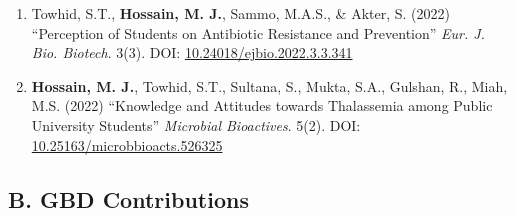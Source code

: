 \documentclass[
  11pt,
  letterpaper,
  DIV=11,
  numbers=noendperiod]{scrartcl}
\begin{document}
\begin{enumerate}
  DOI:
  \href{https://doi.org/10.1038/s41598-023-34205-9}{10.1038/s41598-023-34205-9}
\item
  Towhid, S.T., \textbf{Hossain, M. J.}, Sammo, M.A.S., \& Akter, S.
  (2022) ``Perception of Students on Antibiotic Resistance and
  Prevention'' \emph{Eur. J. Bio. Biotech}. 3(3). DOI:
  \href{https://doi.org/10.24018/ejbio.2022.3.3.341}{10.24018/ejbio.2022.3.3.341}
\item
  \textbf{Hossain, M. J.}, Towhid, S.T., Sultana, S., Mukta, S.A.,
  Gulshan, R., Miah, M.S. (2022) ``Knowledge and Attitudes towards
  Thalassemia among Public University Students'' \emph{Microbial
  Bioactives}. 5(2). DOI:
  \href{https://doi.org/10.25163/microbbioacts.526325}{10.25163/microbbioacts.526325}
\end{enumerate}

\subsection{B. GBD Contributions}\label{b.-gbd-contributions}
\end{document}

